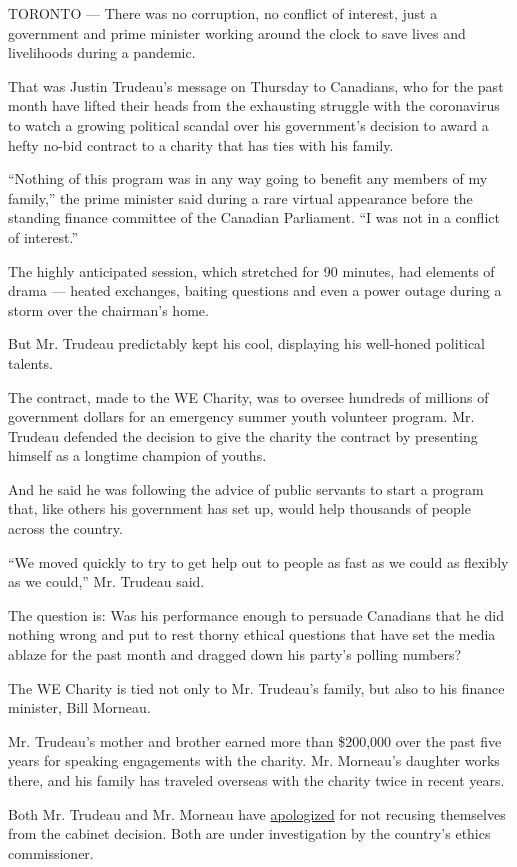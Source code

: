 TORONTO --- There was no corruption, no conflict of interest, just a
government and prime minister working around the clock to save lives and
livelihoods during a pandemic.

That was Justin Trudeau's message on Thursday to Canadians, who for the
past month have lifted their heads from the exhausting struggle with the
coronavirus to watch a growing political scandal over his government's
decision to award a hefty no-bid contract to a charity that has ties
with his family.

``Nothing of this program was in any way going to benefit any members of
my family,'' the prime minister said during a rare virtual appearance
before the standing finance committee of the Canadian Parliament. ``I
was not in a conflict of interest.''

The highly anticipated session, which stretched for 90 minutes, had
elements of drama --- heated exchanges, baiting questions and even a
power outage during a storm over the chairman's home.

But Mr. Trudeau predictably kept his cool, displaying his well-honed
political talents.

The contract, made to the WE Charity, was to oversee hundreds of
millions of government dollars for an emergency summer youth volunteer
program. Mr. Trudeau defended the decision to give the charity the
contract by presenting himself as a longtime champion of youths.

And he said he was following the advice of public servants to start a
program that, like others his government has set up, would help
thousands of people across the country.

``We moved quickly to try to get help out to people as fast as we could
as flexibly as we could,'' Mr. Trudeau said.

The question is: Was his performance enough to persuade Canadians that
he did nothing wrong and put to rest thorny ethical questions that have
set the media ablaze for the past month and dragged down his party's
polling numbers?

The WE Charity is tied not only to Mr. Trudeau's family, but also to his
finance minister, Bill Morneau.

Mr. Trudeau's mother and brother earned more than \$200,000 over the
past five years for speaking engagements with the charity. Mr. Morneau's
daughter works there, and his family has traveled overseas with the
charity twice in recent years.

Both Mr. Trudeau and Mr. Morneau have
\href{https://www.nytimes3xbfgragh.onion/2020/07/13/world/canada/trudeau-we-charity-apology.html}{apologized}
for not recusing themselves from the cabinet decision. Both are under
investigation by the country's ethics commissioner.

